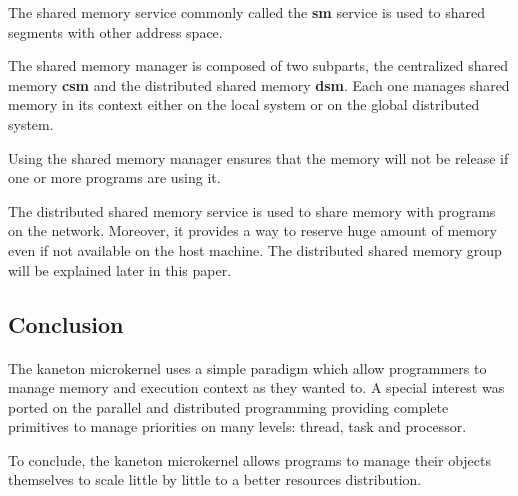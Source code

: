 \documentclass[10pt,a4wide]{article}
\begin{document}
\begin{multicols}{2}
The shared memory service commonly called the \textbf{sm} service is used
to shared segments with other address space.

The shared memory manager is composed of two subparts, the centralized
shared memory \textbf{csm} and the distributed shared memory \textbf{dsm}.
Each one manages shared memory in its context either on the local system
or on the global distributed system.

Using the shared memory manager ensures that the memory will not be release
if one or more programs are using it.

The distributed shared memory service is used to share memory with
programs on the network. Moreover, it provides a way to reserve huge amount
of memory even if not available on the host machine. The distributed shared
memory group will be explained later in this paper.

\subsection{Conclusion}

\paragraph{}

The kaneton microkernel uses a simple paradigm which allow programmers to
manage memory and execution context as they wanted to. A special interest
was ported on the parallel and distributed programming providing complete
primitives to manage priorities on many levels: thread, task and processor.

To conclude, the kaneton microkernel allows programs to manage their objects
themselves to scale little by little to a better resources distribution.

\end{multicols}
\end{document}
